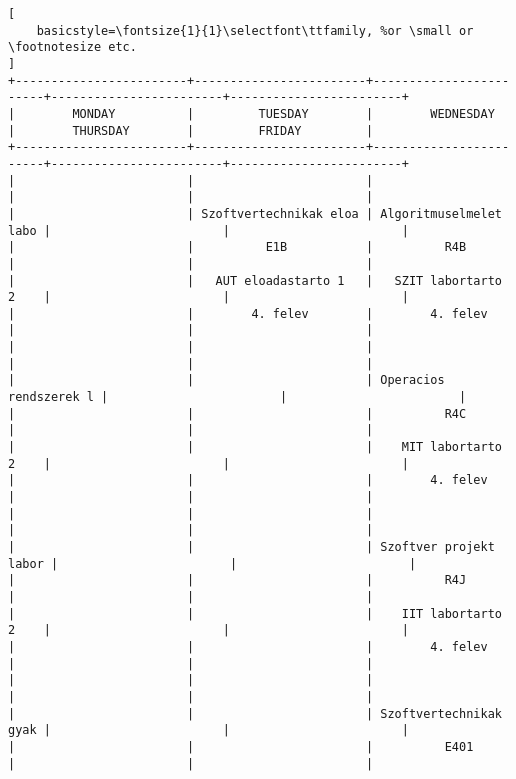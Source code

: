 \begin{lstlisting}[
    basicstyle=\fontsize{1}{1}\selectfont\ttfamily, %or \small or \footnotesize etc.
]
+------------------------+------------------------+------------------------+------------------------+------------------------+
|        MONDAY          |         TUESDAY        |        WEDNESDAY       |        THURSDAY        |         FRIDAY         |
+------------------------+------------------------+------------------------+------------------------+------------------------+
|                        |                        |                        |                        |                        | 
|                        | Szoftvertechnikak eloa | Algoritmuselmelet labo |                        |                        | 
|                        |          E1B           |          R4B           |                        |                        | 
|                        |   AUT eloadastarto 1   |   SZIT labortarto 2    |                        |                        | 
|                        |        4. felev        |        4. felev        |                        |                        | 
|                        |                        |                        |                        |                        | 
|                        |                        | Operacios rendszerek l |                        |                        | 
|                        |                        |          R4C           |                        |                        | 
|                        |                        |    MIT labortarto 2    |                        |                        | 
|                        |                        |        4. felev        |                        |                        | 
|                        |                        |                        |                        |                        | 
|                        |                        | Szoftver projekt labor |                        |                        | 
|                        |                        |          R4J           |                        |                        | 
|                        |                        |    IIT labortarto 2    |                        |                        | 
|                        |                        |        4. felev        |                        |                        | 
|                        |                        |                        |                        |                        | 
|                        |                        | Szoftvertechnikak gyak |                        |                        | 
|                        |                        |          E401          |                        |                        | 

\end{lstlisting}
